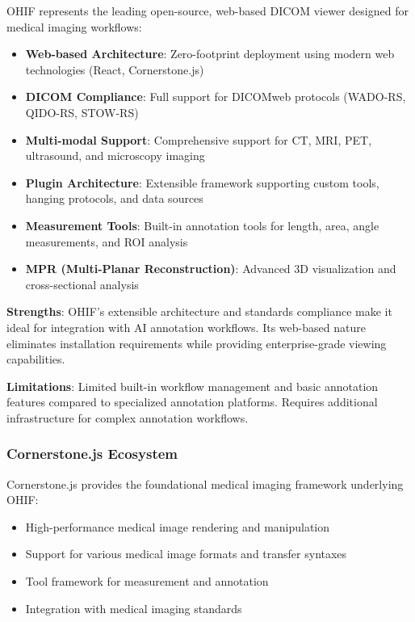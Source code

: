 OHIF \cite{ohif2023} represents the leading open-source, web-based DICOM viewer designed for medical imaging workflows:

\begin{itemize}
    \item \textbf{Web-based Architecture}: Zero-footprint deployment using modern web technologies (React, Cornerstone.js)
    \item \textbf{DICOM Compliance}: Full support for DICOMweb protocols (WADO-RS, QIDO-RS, STOW-RS)
    \item \textbf{Multi-modal Support}: Comprehensive support for CT, MRI, PET, ultrasound, and microscopy imaging
    \item \textbf{Plugin Architecture}: Extensible framework supporting custom tools, hanging protocols, and data sources
    \item \textbf{Measurement Tools}: Built-in annotation tools for length, area, angle measurements, and ROI analysis
    \item \textbf{MPR (Multi-Planar Reconstruction)}: Advanced 3D visualization and cross-sectional analysis
\end{itemize}

\textbf{Strengths}: OHIF's extensible architecture and standards compliance make it ideal for integration with AI annotation workflows. Its web-based nature eliminates installation requirements while providing enterprise-grade viewing capabilities.

\textbf{Limitations}: Limited built-in workflow management and basic annotation features compared to specialized annotation platforms. Requires additional infrastructure for complex annotation workflows.

\subsubsection{Cornerstone.js Ecosystem}

Cornerstone.js \cite{cornerstone2023} provides the foundational medical imaging framework underlying OHIF:

\begin{itemize}
    \item High-performance medical image rendering and manipulation
    \item Support for various medical image formats and transfer syntaxes
    \item Tool framework for measurement and annotation
    \item Integration with medical imaging standards
\end{itemize}

